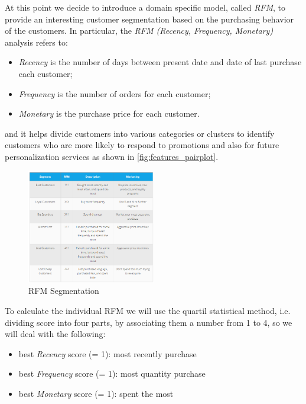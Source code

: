At this point we decide to introduce a domain specific model, called \emph{RFM}, to provide an interesting customer segmentation based on the purchasing behavior of the customers. In particular, the \emph{RFM (Recency, Frequency, Monetary)} analysis refers to:

\begin{itemize}
\item \emph{Recency} is the number of days between present date and date of last purchase each customer;
\item \emph{Frequency} is the number of orders for each customer;
\item \emph{Monetary} is the purchase price for each customer.
\end{itemize}

and it helps divide customers into various categories or clusters to identify customers who are more likely to respond to promotions and also for future personalization services as shown in \ref{fig:features_pairplot}.

\begin{figure}[!h]
\centering
\includegraphics[width=0.5\textwidth]{img/preparation/rfm_seg.png}
\caption{RFM Segmentation}
\label{fig:rfm_seg}
\end{figure}

To calculate the individual RFM we will use the quartil statistical method, i.e. dividing score into four parts, by associating them a number from 1 to 4, so we will deal with the following:

\begin{itemize}
\item best \emph{Recency} score (= 1): most recently purchase
\item best \emph{Frequency} score (= 1): most quantity purchase
\item best \emph{Monetary} score (= 1): spent the most
\end{itemize}


